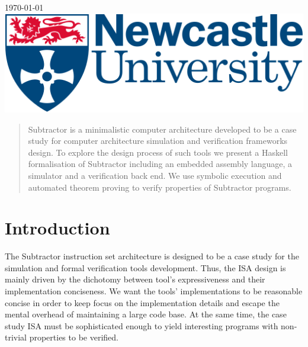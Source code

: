 \begin{titlepage}

{\large \today}\\[2cm] %


\includegraphics[scale=0.5]{logo.png}\\[1cm] %


\vfill %

\end{titlepage}

\begin{abstract}
Subtractor is a minimalistic computer architecture developed to be
a case study for computer architecture simulation and verification frameworks
design. To explore the design process of such tools we present a Haskell formalisation of Subtractor including an embedded assembly language, a simulator and a verification back end. We use symbolic execution and automated theorem proving to verify properties of Subtractor programs.

\end{abstract}

\tableofcontents

\section{Introduction}

The Subtractor instruction set architecture is designed to be a case study for
the simulation and formal verification tools development. Thus, the ISA design is mainly driven by the dichotomy between tool's expressiveness and their implementation conciseness.
We want the tools' implementations to be reasonable concise in order to keep focus on the
implementation details and escape the mental overhead of maintaining a large code base. At the same time, the case study ISA must be sophisticated enough to
yield interesting programs with non-trivial properties to be verified.

